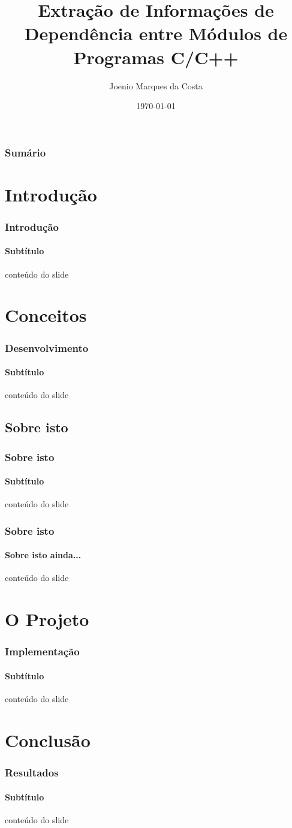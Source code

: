 \documentclass{beamer}
\title[Extração de Informações de Dependência entre Módulos de Programas C/C++]{Extração de Informações de Dependência entre Módulos de Programas C/C++}
\author[Joenio Costa]{Joenio Marques da Costa}
\institute{UCSal - Universidade Católica do Salvador}
\date{\today}
\begin{document}
\frame{\titlepage} %

\begin{frame}
 \frametitle{Sumário}
 \tableofcontents
\end{frame}

\section{Introdução}

\begin{frame}
\frametitle{Introdução}
\framesubtitle{Subtítulo}
 conteúdo do slide
\end{frame}

\section{Conceitos}

\begin{frame}
\frametitle{Desenvolvimento}
\framesubtitle{Subtítulo}
 conteúdo do slide
\end{frame}

\subsection{Sobre isto}

\begin{frame}
\frametitle{Sobre isto}
\framesubtitle{Subtítulo}
 conteúdo do slide
\end{frame}

\begin{frame}
\frametitle{Sobre isto}
\framesubtitle{Sobre isto ainda...}
 conteúdo do slide
\end{frame}

\section{O Projeto}

\begin{frame}
\frametitle{Implementação}
\framesubtitle{Subtítulo}
 conteúdo do slide
\end{frame}

\section{Conclusão}

\begin{frame}
\frametitle{Resultados}
\framesubtitle{Subtítulo}
 conteúdo do slide
\end{frame}
\end{document}
